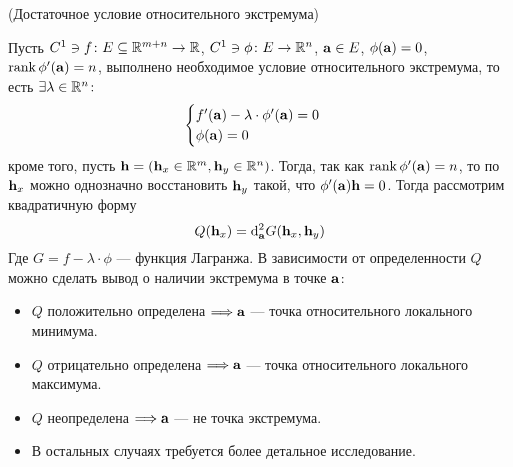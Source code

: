 \begin{theorem}(Достаточное условие относительного экстремума)

    Пусть $C^1 \ni f \colon E \subseteq \mathbb{R}^{m + n} \to \mathbb{R}$, $C^1 \ni \phi \colon
    E \to \mathbb{R}^n$, $\mathbf{a} \in E$, $\phi(\mathbf{a}) = 0$, $\operatorname{rank}{\phi'(\mathbf{a})} = n$,
    выполнено необходимое условие относительного экстремума, то есть $\exists
    \lambda \in \mathbb{R}^n \colon$
 \[
     \begin{cases}
         f'(\mathbf{a}) - \lambda \cdot \phi'(\mathbf{a}) = 0 \\
         \phi(\mathbf{a}) = 0
     \end{cases}
 \]
    кроме того, пусть $\mathbf{h} = (\mathbf{h}_x \in \mathbb{R}^m, \mathbf{h}_y \in \mathbb{R}^n)$. Тогда, так как
    $\operatorname{rank}{\phi'(\mathbf{a})} = n$, то по $\mathbf{h}_x$ можно однозначно восстановить $\mathbf{h}_y$ такой,
    что $\phi'(\mathbf{a})\mathbf{h} = 0$. Тогда рассмотрим квадратичную форму
\[
    Q(\mathbf{h}_x) = \mathrm{d}^2_{\mathbf{a}}{G(\mathbf{h}_x, \mathbf{h}_y)}
\]
    Где $G = f - \lambda \cdot \phi$ --- функция Лагранжа. В зависимости от
    определенности $Q$ можно сделать вывод о наличии экстремума в точке $\mathbf{a}$:
    \begin{itemize}
        \item $Q$ положительно определена $\Longrightarrow \mathbf{a}$ --- точка относительного
        локального минимума.
        \item $Q$ отрицательно определена $\Longrightarrow \mathbf{a}$ --- точка относительного
        локального максимума.
        \item $Q$ неопределена $\Longrightarrow \mathbf{a}$ --- не точка экстремума.
        \item В остальных случаях требуется более детальное исследование.
    \end{itemize}
\end{theorem}

